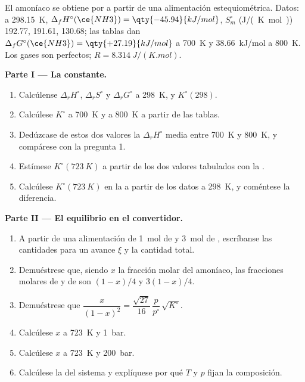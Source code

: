 \begin{problem}
\label{pb:b2:equilibrium-shifts:1}
El amoníaco se obtiene por  a partir de una alimentación estequiométrica.
Datos: a \qty{298.15}{K}, $\Delta_f H^\circ(\ce{NH3}) = \qty{-45.94}{kJ/mol}$,
$S^\circ_m$ (\unit{J/(K.mol)})  192.77,  191.61,  130.68;
las tablas dan $\Delta_f G^\circ(\ce{NH3}) = \qty{+27.19}{kJ/mol}$ a
\qty{700}{K} y \qty{+38.66}{kJ/mol} a \qty{800}{K}. Los gases son perfectos;
$R = \qty{8.314}{J/(K.mol)}$.

\medskip
\noindent\textbf{Parte I --- La constante.}
\begin{enumerate}
  \item Calcúlense $\Delta_r H^\circ$, $\Delta_r S^\circ$ y $\Delta_r G^\circ$ a
        \qty{298}{K}, y $K^\circ(298)$.
  \item Calcúlese $K^\circ$ a \qty{700}{K} y a \qty{800}{K} a partir de las tablas.
  \item Dedúzcase de estos dos valores la $\Delta_r H^\circ$ media entre
        \qty{700}{K} y \qty{800}{K}, y compárese con la pregunta 1.
  \item Estímese $K^\circ(\qty{723}{K})$ a partir de los dos valores tabulados con
        la .
  \item Calcúlese $K^\circ(\qty{723}{K})$ en la  a partir de
        los datos a \qty{298}{K}, y coméntese la diferencia.
\end{enumerate}

\medskip
\noindent\textbf{Parte II --- El equilibrio en el convertidor.}
\begin{enumerate}[resume]
  \item A partir de una alimentación de \qty{1}{mol} de  y \qty{3}{mol} de , escríbanse las
        cantidades para un avance $\xi$ y la cantidad total.
  \item Demuéstrese que, siendo $x$ la fracción molar del amoníaco, las fracciones molares
        de  y de  son $(1-x)/4$ y $3(1-x)/4$.
  \item Demuéstrese que $\dfrac{x}{(1-x)^2} = \dfrac{\sqrt{27}}{16}\,\dfrac{p}{p^\circ}\,
        \sqrt{K^\circ}$.
  \item Calcúlese $x$ a \qty{723}{K} y \qty{1}{bar}.
  \item Calcúlese $x$ a \qty{723}{K} y \qty{200}{bar}.
  \item Calcúlese la  del sistema y explíquese por qué $T$ y $p$ fijan la
        composición.
\end{enumerate}


\end{problem}
